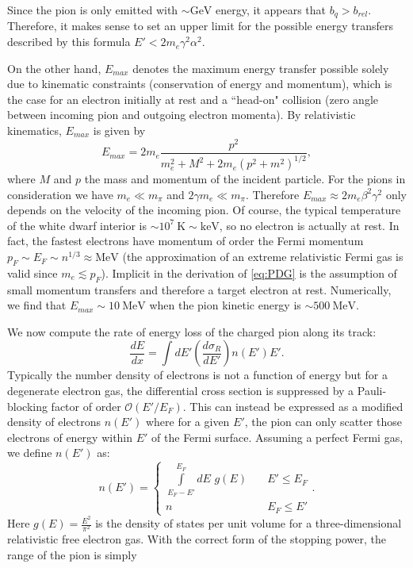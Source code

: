 \documentclass[11 pt, preprint,preprintnumbers,amsmath,amssymb, prd]{revtex4}
\begin{document}
Since the pion is only emitted with $\sim \text{GeV}$ energy, it appears that $b_q > b_{rel}$. Therefore, it makes sense to set an upper limit for the possible energy transfers described by this formula $E' < 2 m_e \gamma^2 \alpha^2$. 

On the other hand, $E_{max}$ denotes the maximum energy transfer possible solely due to kinematic constraints (conservation of energy and momentum), which is the case for an electron initially at rest and a ``head-on" collision (zero angle between incoming pion and outgoing electron momenta). By relativistic kinematics, $E_{max}$ is given by 
\begin{equation}
E_{max} = 2 m_e \frac{p^2}{m_e^2 + M^2 + 2m_e (p^2 +m^2)^{1/2}},
\end{equation}
where $M$ and $p$ the mass and momentum of the incident particle. For the pions in consideration we have $m_e \ll m_\pi$ and $2 \gamma m_e \ll m_\pi$. Therefore $E_{max} \approx 2 m_e \beta^2 \gamma^2$ only depends on the velocity of the incoming pion. Of course, the typical temperature of the white dwarf interior is $\sim 10^{7} ~\text{K} \sim \text{keV}$, so no electron is actually at rest. In fact, the fastest electrons have momentum of order the Fermi momentum $p_F \sim E_F \sim n^{1/3} \approx \text{MeV}$ (the approximation of an extreme relativistic Fermi gas is valid since $m_e \lesssim p_F$). Implicit in the derivation of \ref{eq:PDG} is the assumption of small momentum transfers and therefore a target electron at rest. Numerically, we find that $E_{max} \sim 10 ~\text{MeV}$ when the pion kinetic energy is $\sim 500 ~\text{MeV}$. 


We now compute the rate of energy loss of the charged pion along its track:
\begin{equation}
\label{eq:SP}
\frac{dE}{dx} = \int dE' \left(\frac{d \sigma_R}{dE'}\right) n(E') E'.
\end{equation}
Typically the number density of electrons is not a function of energy but for a degenerate electron gas, the differential cross section is suppressed by a Pauli-blocking factor of order $\mathcal{O}(E'/E_F)$. This can instead be expressed as a modified density of electrons $n(E')$ where for a given $E'$, the pion can only scatter those electrons of energy within $E'$ of the Fermi surface. Assuming a perfect Fermi gas, we define $n(E')$ as:
\begin{equation}
n(E') = \left\{
        \begin{array}{ll}
            \displaystyle \int \limits_{E_F -E'}^{E_F}dE \hspace{4pt} g(E) & \quad E' \leq E_F \\
            n & \quad E_F \leq E'
        \end{array}
    \right..
\end{equation}
Here $g(E) = \frac{E^2}{\pi^2}$ is the density of states per unit volume for a three-dimensional relativistic free electron gas. With the correct form of the stopping power, the range of the pion is simply 
\end{document}
